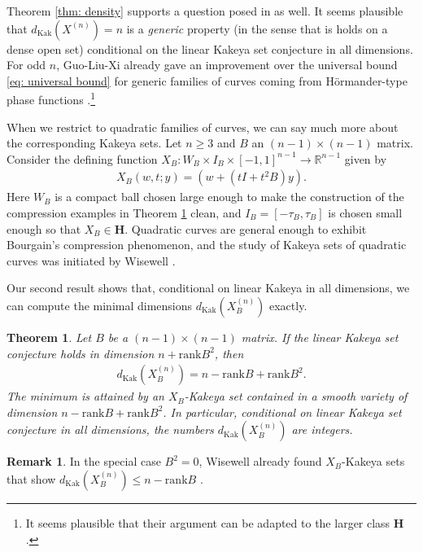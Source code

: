 \documentclass[reqno,11pt]{amsart}
\numberwithin{equation}{section}
\numberwithin{figure}{section}
\def\R{\mathbb{R}}
\renewcommand\leq{\leqslant}
\renewcommand\geq{\geqslant}
\theoremstyle{plain}
\newtheorem{theorem}[thm]{Theorem}
\theoremstyle{definition}
\newtheorem{remark}[thm]{Remark}
\newcommand{\rank}{\mathrm{rank}}
\newcommand{\Kak}{\mathrm{Kak}}
\begin{document}
    Theorem \ref{thm: density} supports a question posed in \cite[Section 1.9]{guo2026curvedkakeyaproblemsprojective} as well. It seems plausible that $d_{\Kak}(X^{(n)}) = n$ is a \emph{generic} property (in the sense that is holds on a dense open set) conditional on the linear Kakeya set conjecture in all dimensions. 
    For odd $n$, Guo-Liu-Xi already gave an improvement over the universal bound \eqref{eq: universal bound} for generic families of curves coming from H\"ormander-type phase functions \cite{guo2025curvedkakeyasetsgeneric}.\footnote{
    It seems plausible that their argument can be adapted to the larger class $\mathbf H$.}

    When we restrict to quadratic families of curves, we can say much more about the corresponding Kakeya sets. Let $n \geq 3$ and $B$ an $(n-1) \times (n-1)$ matrix. Consider the defining function $X_B : W_B \times I_B \times [-1,1]^{n-1} \to \R^{n-1}$ given by 
    \begin{align}\label{eq: quadratic def}
        X_B(w,t;y) = (w + (tI + t^2 B)y).
    \end{align}
    Here $W_B$ is a compact ball chosen large enough to make the construction of the compression examples in Theorem \ref{thm: quadratic} clean, and $I_B = [-\tau_B, \tau_B]$ is chosen small enough so that $X_B \in \mathbf H$. 
    Quadratic curves are general enough to exhibit Bourgain's compression phenomenon, and the study of Kakeya sets of quadratic curves was initiated by Wisewell \cite{wisewell}.

    
    Our second result shows that, conditional on linear Kakeya in all dimensions, we can compute the minimal dimensions $d_{\Kak}(X_B^{(n)})$ exactly. 
    
    
    \begin{theorem}\label{thm: quadratic}
        Let $B$ be a $(n-1) \times (n-1)$ matrix. If the linear Kakeya set conjecture holds in dimension $n + \rank B^2$, then 
        \begin{align}
            d_{\Kak}(X_B^{(n)}) = n-\rank B + \rank B^2.
        \end{align}
        The minimum is attained by an $X_B$-Kakeya set contained in a smooth variety of dimension $n-\rank B + \rank B^2$.
        In particular, conditional on linear Kakeya set conjecture in all dimensions, the numbers $d_{\Kak}(X^{(n)}_B)$ are integers. 
    \end{theorem}

    \begin{remark}
        In the special case $B^2 = 0$, Wisewell already found $X_B$-Kakeya sets that show $d_{\Kak}(X_B^{(n)}) \leq n - \rank B$ \cite[Proposition 29]{wisewell}.
    \end{remark}
    
\end{document}
